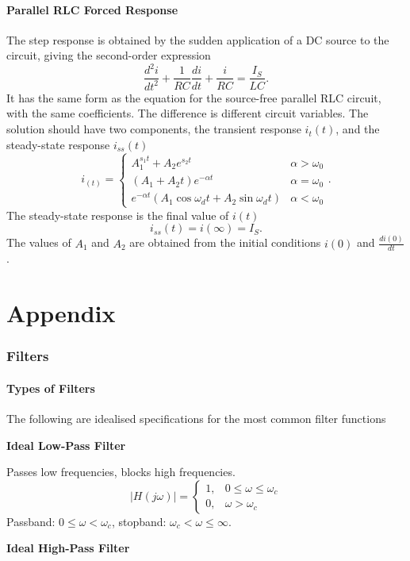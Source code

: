 \documentclass{article}
\begin{document}
\subsection{Parallel RLC Forced Response}
The step response is obtained by the sudden application of a DC source to the circuit, giving the second-order expression 
\[
    \frac{d^2i}{d t^2}+\frac{1}{RC}\frac{d i}{d t}+\frac{i}{RC}=\frac{I_S}{LC}.
\]
It has the same form as the equation for the source-free parallel RLC circuit, with the same coefficients. The difference is different circuit variables. The solution should have two components, the transient response $i_t(t)$, and the steady-state response $i_{ss}(t)$ 
\[
    i_(t)=\begin{cases}
        A_1^{s_1t}+A_2e^{s_2t} & \alpha >\omega _0 \\
        \left( A_1+A_2t \right)e^{-\alpha t} & \alpha =\omega _0\\
        e^{-\alpha t}\left( A_1 \cos\omega _dt+A_2\sin\omega _dt \right) & \alpha <\omega _0
    \end{cases}.
\]
The steady-state response is the final value of $i(t)$ 
\[
    i_{ss}(t)=i(\infty)=I_S.
\]
The values of $A_1$ and $A_2$ are obtained from the initial conditions $i(0)$ and $\frac{d i(0)}{d t}$.

\newpage
\appendix
\part{Appendix}
\section{Filters}
\subsection{Types of Filters}
The following are idealised specifications for the most common filter functions

\noindent\textbf{Ideal Low-Pass Filter}

Passes low frequencies, blocks high frequencies.
\[
    |H(j\omega )|=\begin{cases}
        1, & 0\leq\omega \leq\omega _c \\
        0, & \omega >\omega _c
    \end{cases}
\]
\indent Passband: $0\leq\omega <\omega _c$, stopband: $\omega _c<\omega \leq\infty$.

\noindent \textbf{Ideal High-Pass Filter}
\end{document}
